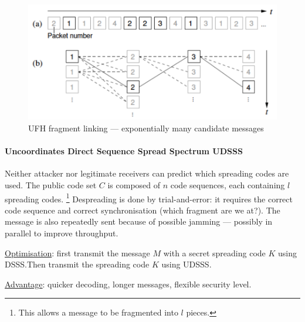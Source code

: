 \begin{figure}[h]
	\centering
	\includegraphics[scale=0.4]{images/3-ufh-fragment-linking.png}
	\caption{UFH fragment linking --- exponentially many candidate messages}%
	\label{fig:ufh-fragment-linking}
\end{figure}

\paragraph{Uncoordinates Direct Sequence Spread Spectrum UDSSS}
Neither attacker nor legitimate receivers can predict which spreading codes are used.
The public code set $C$ is composed of $n$ code sequences, each containing $l$ spreading codes.%
\footnote{This allows a message to be fragmented into $l$ pieces.}
Despreading is done by trial-and-error: it requires the correct code sequence and correct synchronisation (which fragment are we at?).
The message is also repeatedly sent because of possible jamming --- possibly in parallel to improve throughput.

\underline{Optimisation}: first transmit the message $M$ with a secret spreading code $K$ using DSSS.\@ Then transmit the spreading code $K$ using UDSSS.\@

\underline{Advantage}: quicker decoding, longer messages, flexible security level.


